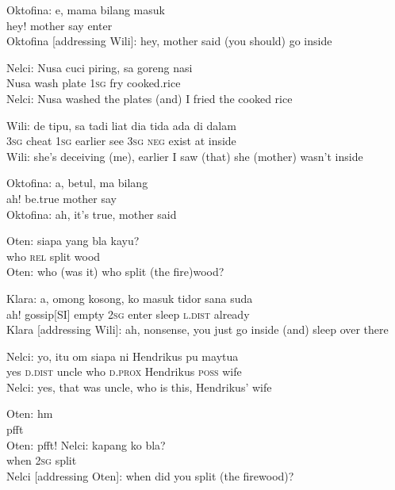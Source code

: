 \ea
\gll   Oktofina:   e,   mama   bilang   masuk\\
 {}   hey!   mother   say   enter\\
\glt
Oktofina [addressing Wili]: hey, mother said (you should) go inside
\z

\ea
\label{Example_B.53}
\gll   Nelci:   Nusa   cuci   piring,   sa   goreng   nasi\\
  {}   Nusa   wash   plate   \textsc{1sg}   fry   cooked.rice\\
\glt
Nelci: Nusa washed the plates (and) I fried the cooked rice
\z

\ea
\gll   Wili:   de   tipu,   sa   tadi   liat   dia   tida   ada   di   dalam\\
  {}   \textsc{3sg}   cheat   \textsc{1sg}   earlier   see   \textsc{3sg}   \textsc{neg}   exist   at   inside\\
\glt
Wili: she’s deceiving (me), earlier I saw (that) she (mother) wasn’t inside
\z

\ea
\gll   Oktofina:   a,   betul,   ma   bilang\\
 {}    ah!   be.true   mother   say\\
\glt
Oktofina: ah, it’s true, mother said
\z

\ea
\gll   Oten:   siapa   yang   bla   kayu?\\
 {}    who   \textsc{rel}   split   wood\\
\glt
Oten: who (was it) who split (the fire)wood?
\z

\ea
\gll   Klara:   a,   omong   kosong,   ko   masuk   tidor   sana   suda\\
 {}    ah!   gossip[SI]   empty   \textsc{2sg}   enter   sleep   \textsc{l.dist}   already\\
\glt
Klara [addressing Wili]: ah, nonsense, you just go inside (and) sleep over there
\z

\ea
\gll   Nelci:   yo,   itu   om   siapa   ni   Hendrikus   pu   maytua\\
 {}    yes   \textsc{d.dist}   uncle   who   \textsc{d.prox}   Hendrikus   \textsc{poss}   wife\\
\glt
Nelci: yes, that was uncle, who is this, Hendrikus’ wife
\z

\ea
\gll   Oten:   hm\\
{}     pfft\\
\glt
Oten: pfft!
\z
\ea
\gll   Nelci:   kapang   ko   bla?\\
 {}     when   \textsc{2sg}   split\\
\glt
Nelci [addressing Oten]: when did you split (the firewood)?
\z

